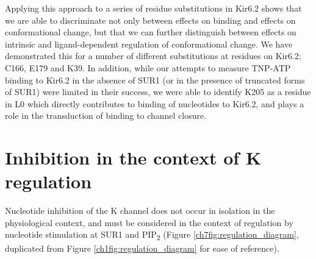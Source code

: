 Applying this approach to a series of residue substitutions in Kir6.2 shows that we are able to discriminate not only between effects on binding and effects on conformational change, but that we can further distinguish between effects on intrinsic and ligand-dependent regulation of conformational change.
We have demonstrated this for a number of different substitutions at residues on Kir6.2; C166, E179 and K39.
In addition, while our attempts to measure TNP-ATP binding to Kir6.2 in the absence of SUR1 (or in the presence of truncated forms of SUR1) were limited in their success, we were able to identify K205 as a residue in L0 which directly contributes to binding of nucleotides to Kir6.2, and plays a role in the transduction of binding to channel closure.

\section{Inhibition in the context of K\ATP{} regulation}

Nucleotide inhibition of the K\ATP{} channel does not occur in isolation in the physiological context, and must be considered in the context of regulation by nucleotide stimulation at SUR1 and PIP\textsubscript{2} (Figure \ref{ch7fig:regulation_diagram}, duplicated from Figure \ref{ch1fig:regulation_diagram} for ease of reference).

